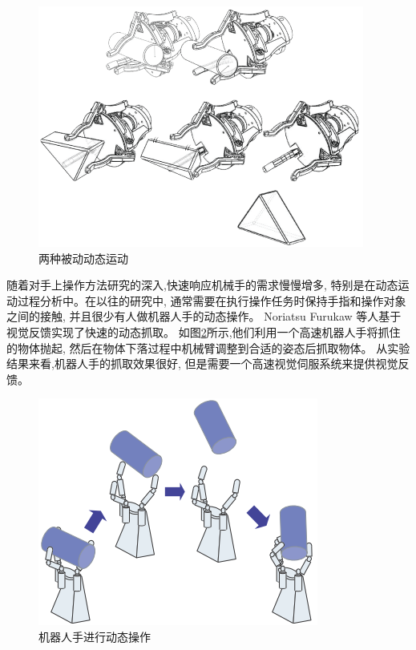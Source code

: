 \begin{figure}[!ht]
  \centering
  \includegraphics[scale=1]{chapter01/pics/1-2.png}
  \caption{两种被动动态运动}
  \label{fig:1-2}
  \vspace{-0.3cm}
\end{figure}

随着对手上操作方法研究的深入,快速响应机械手的需求慢慢增多,
特别是在动态运动过程分析中。在以往的研究中,
通常需要在执行操作任务时保持手指和操作对象之间的接触,
并且很少有人做机器人手的动态操作。
Noriatsu Furukaw 等人基于视觉反馈实现了快速的动态抓取。
如图\ref{fig:1-3}所示,他们利用一个高速机器人手将抓住的物体抛起,
然后在物体下落过程中机械臂调整到合适的姿态后抓取物体。
从实验结果来看,机器人手的抓取效果很好,
但是需要一个高速视觉伺服系统来提供视觉反馈\cite{ref8}。

\begin{figure}[!ht]
  \centering
  \includegraphics[scale=1]{chapter01/pics/1-3.png}
  \caption{机器人手进行动态操作}
  \label{fig:1-3}
  \vspace{-0.3cm}
\end{figure}

